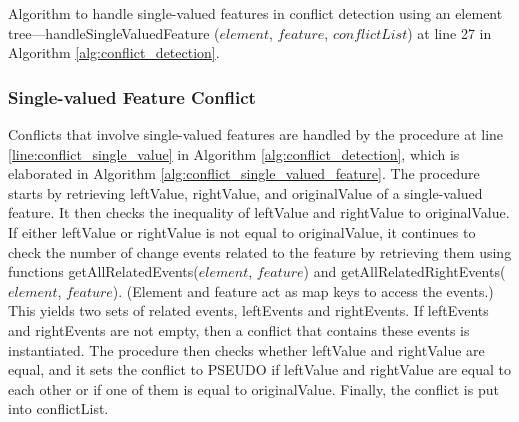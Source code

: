 \IncMargin{1.5em}
\begin{algorithm*}[]
  \begin{scriptsize}
  \end{scriptsize}
  \caption{Algorithm to handle single-valued features in conflict detection using an element tree—handleSingleValuedFeature ($element$, $feature$, $conflictList$) at line 27 in Algorithm \ref{alg:conflict_detection}.}
  \label{alg:conflict_single_valued_feature}
\end{algorithm*}
\DecMargin{1.5em}

\subsubsection{Single-valued Feature Conflict}
\label{sec:single_valued_conflict}
Conflicts that involve single-valued features are handled by the procedure at line \ref{line:conflict_single_value} in Algorithm \ref{alg:conflict_detection}, which is elaborated in Algorithm \ref{alg:conflict_single_valued_feature}. The procedure starts by retrieving \textsf{leftValue}, \textsf{rightValue}, and \textsf{originalValue} of a single-valued feature. It then checks the inequality of \textsf{leftValue} and \textsf{rightValue} to \textsf{originalValue}. If either \textsf{leftValue} or \textsf{rightValue} is not equal to \textsf{originalValue}, it continues to check the number of change events related to the feature by retrieving them using functions \textsf{getAllRelatedEvents($element$, $feature$)} and \textsf{getAllRelatedRightEvents($element$, $feature$)}. (Element and feature act as map keys to access the events.) This yields two sets of related events, \textsf{leftEvents} and \textsf{rightEvents}. If \textsf{leftEvents} and \textsf{rightEvents} are not empty, then a conflict that contains these events is instantiated. The procedure then checks whether \textsf{leftValue} and \textsf{rightValue} are equal, and it sets the conflict to \textsf{PSEUDO} if \textsf{leftValue} and \textsf{rightValue} are equal to each other or if one of them is equal to \textsf{originalValue}. Finally, the conflict is put into \textsf{conflictList}.


